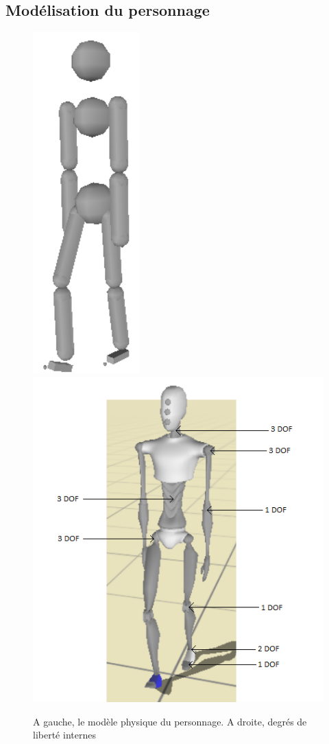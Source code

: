 \documentclass[runningheads,a4paper]{llncs}
\begin{document}
\subsection{Modélisation du personnage}
%
\begin{figure}[h]
\centering
\includegraphics[scale=0.4]{colli_primitives.png}
\includegraphics[scale=0.4]{img_dof.png}
\caption{A gauche, le modèle physique du personnage. A droite, degrés de liberté internes}
\label{fig:colli_primitives}
\label{fig:dof}
\end{figure}
\end{document}
